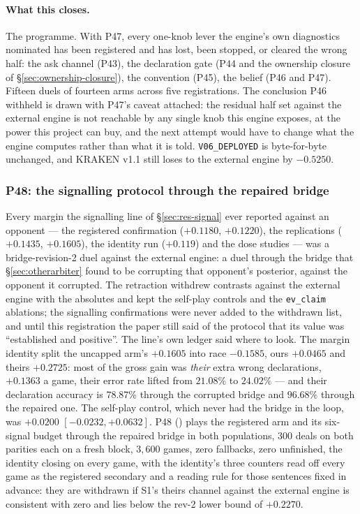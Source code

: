 \documentclass[11pt,letterpaper]{article}
\begin{document}
\paragraph{What this closes.} The programme. With P47, every one-knob lever
the engine's own diagnostics nominated has been registered and has lost, been
stopped, or cleared the wrong half: the ask channel (P43), the declaration
gate (P44 and the ownership closure of \S\ref{sec:ownership-closure}), the
convention (P45), the belief (P46 and P47). Fifteen duels of fourteen arms
across five registrations. The conclusion P46 withheld is drawn with P47's
caveat attached: the residual half set against the external engine is not reachable by
any single knob this engine exposes, at the power this project can buy, and
the next attempt would have to change what the engine computes rather than
what it is told. \texttt{V06\_DEPLOYED} is byte-for-byte unchanged, and
KRAKEN v1.1 still loses to the external engine by $-0.5250$.

\subsubsection{P48: the signalling protocol through the repaired bridge}
\label{sec:p48}

Every margin the signalling line of \S\ref{sec:res-signal} ever reported
against an opponent --- the registered confirmation ($+0.1180$, $+0.1220$),
the replications ($+0.1435$, $+0.1605$), the identity run ($+0.119$) and the
dose studies --- was a bridge-revision-2 duel against the external engine: a
duel through the bridge that \S\ref{sec:otherarbiter} found to be corrupting
that opponent's posterior, against the opponent it corrupted. The retraction
withdrew contrasts against the external engine with the absolutes and kept the
self-play controls and the \texttt{ev\_claim} ablations; the signalling
confirmations were never added to the withdrawn list, and until this
registration the paper still said of the protocol that its value was
``established and positive''. The line's own ledger said where to look. The
margin identity split the uncapped arm's $+0.1605$ into race $-0.1585$, ours
$+0.0465$ and theirs $+0.2725$: most of the gross gain was \emph{their} extra
wrong declarations, $+0.1363$ a game, their error rate lifted from $21.08\%$
to $24.02\%$ --- and their declaration accuracy is $78.87\%$ through the
corrupted bridge and $96.68\%$ through the repaired one. The self-play
control, which never had the bridge in the loop, was $+0.0200$
$[-0.0232, +0.0632]$. P48 ()
plays the registered arm and its six-signal budget through the repaired
bridge in both populations, $300$ deals on both parities each on a fresh
block, $3{,}600$ games, zero fallbacks, zero unfinished, the identity closing
on every game, with the identity's three counters read off every game as the
registered secondary and a reading rule for those sentences fixed in advance:
they are withdrawn if S1's theirs channel against the external engine is consistent with
zero and lies below the rev-2 lower bound of $+0.2270$.
\end{document}
